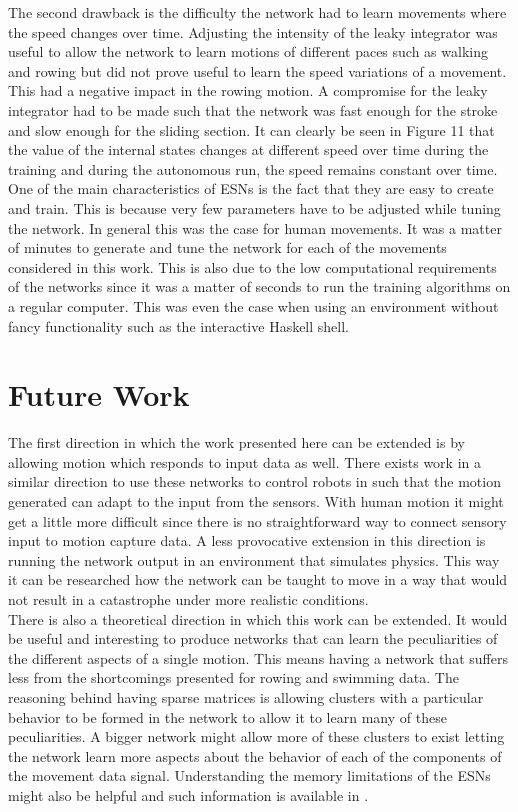 \documentclass[letterpaper,9pt]{article}
\begin{document}
The second drawback is the difficulty the network had to learn movements where the speed changes over time. Adjusting the intensity of the leaky integrator was useful to allow the network to learn motions of different paces such as walking and rowing but did not prove useful to learn the speed variations of a movement. This had a negative impact in the rowing motion. A compromise for the leaky integrator had to be made such that the network was fast enough for the stroke and slow enough for the sliding section. It can clearly be seen in Figure 11 that the value of the internal states changes at different speed over time during the training and during the autonomous run, the speed remains constant over time.\\

One of the main characteristics of ESNs is the fact that they are easy to create and train. This is because very few parameters have to be adjusted while tuning the network. In general this was the case for human movements. It was a matter of minutes to generate and tune the network for each of the movements considered in this work. This is also due to the low computational requirements of the networks since it was a matter of seconds to run the training algorithms on a regular computer. This was even the case when using an environment without fancy functionality such as the interactive Haskell shell.

\section{Future Work}

The first direction in which the work presented here can be extended is by allowing motion which responds to input data as well. There exists work in a similar direction to use these networks to control robots in \cite{ESNRobots} such that the motion generated can adapt to the input from the sensors. With human motion it might get a little more difficult since there is no straightforward way to connect sensory input to motion capture data. A less provocative extension in this direction is running the network output in an environment that simulates physics. This way it can be researched how the network can be taught to move in a way that would not result in a catastrophe under more realistic conditions.\\

There is also a theoretical direction in which this work can be extended. It would be useful and interesting to produce networks that can learn the peculiarities of the different aspects of a single motion. This means having a network that suffers less from the shortcomings presented for rowing and swimming data. The reasoning behind having sparse matrices is allowing clusters with a particular behavior to be formed in the network to allow it to learn many of these peculiarities. A bigger network might allow more of these clusters to exist letting the network learn more aspects about the behavior of each of the components of the movement data signal. Understanding the memory limitations of the ESNs might also be helpful and such information is available in \cite{ESNMemory}.\\
\end{document}
